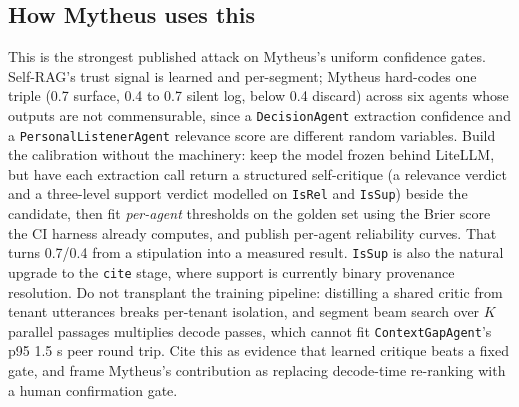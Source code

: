 \subsection{How Mytheus uses this}
\begin{takeaway}
This is the strongest published attack on Mytheus's uniform confidence gates. Self-RAG's trust signal is learned and per-segment; Mytheus hard-codes one triple (0.7 surface, 0.4 to 0.7 silent log, below 0.4 discard) across six agents whose outputs are not commensurable, since a \texttt{DecisionAgent} extraction confidence and a \texttt{PersonalListenerAgent} relevance score are different random variables. Build the calibration without the machinery: keep the model frozen behind LiteLLM, but have each extraction call return a structured self-critique (a relevance verdict and a three-level support verdict modelled on \texttt{IsRel} and \texttt{IsSup}) beside the candidate, then fit \emph{per-agent} thresholds on the golden set using the Brier score the CI harness already computes, and publish per-agent reliability curves. That turns 0.7/0.4 from a stipulation into a measured result. \texttt{IsSup} is also the natural upgrade to the \texttt{cite} stage, where support is currently binary provenance resolution. Do not transplant the training pipeline: distilling a shared critic from tenant utterances breaks per-tenant isolation, and segment beam search over $K$ parallel passages multiplies decode passes, which cannot fit \texttt{ContextGapAgent}'s p95 1.5 s peer round trip. Cite this as evidence that learned critique beats a fixed gate, and frame Mytheus's contribution as replacing decode-time re-ranking with a human confirmation gate.
\end{takeaway}

